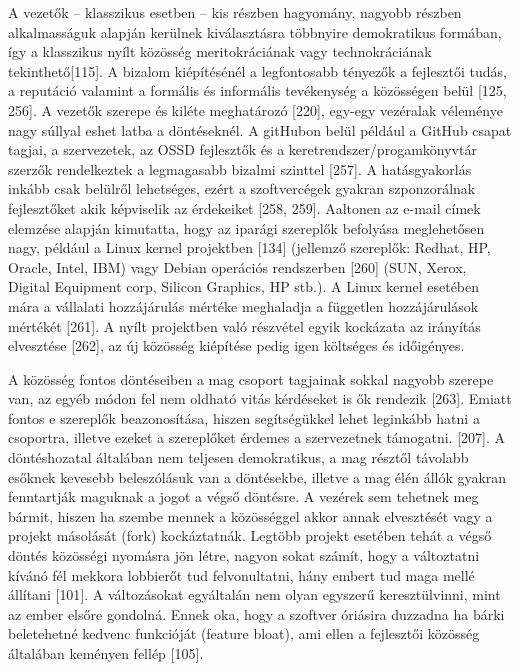 \documentclass[12pt,magyar,a4paper,oneside]{scrreprt}
\begin{document}
A vezetők -- klasszikus esetben -- kis részben hagyomány, nagyobb
részben alkalmasságuk alapján kerülnek kiválasztásra többnyire
demokratikus formában, így a klasszikus nyílt közösség meritokráciának
vagy technokráciának tekinthető{[}115{]}. A bizalom kiépítésénél a
legfontosabb tényezők a fejlesztői tudás, a reputáció valamint a
formális és informális tevékenység a közösségen belül {[}125, 256{]}. A
vezetők szerepe és kiléte meghatározó {[}220{]}, egy-egy vezéralak
véleménye nagy súllyal eshet latba a döntéseknél. A gitHubon belül
például a GitHub csapat tagjai, a szervezetek, az OSSD fejlesztők és a
keretrendszer/progamkönyvtár szerzők rendelkeztek a legmagasabb bizalmi
szinttel {[}257{]}. A hatásgyakorlás inkább csak belülről lehetséges,
ezért a szoftvercégek gyakran szponzorálnak fejlesztőket akik képviselik
az érdekeiket {[}258, 259{]}. Aaltonen az e-mail címek elemzése alapján
kimutatta, hogy az iparági szereplők befolyása meglehetősen nagy,
például a Linux kernel projektben {[}134{]} (jellemző szereplők: Redhat,
HP, Oracle, Intel, IBM) vagy Debian operációs rendszerben {[}260{]}
(SUN, Xerox, Digital Equipment corp, Silicon Graphics, HP stb.). A Linux
kernel esetében mára a vállalati hozzájárulás mértéke meghaladja a
független hozzájárulások mértékét {[}261{]}. A nyílt projektben való
részvétel egyik kockázata az irányítás elvesztése {[}262{]}, az új
közösség kiépítése pedig igen költséges és időigényes.

A közösség fontos döntéseiben a mag csoport tagjainak sokkal nagyobb
szerepe van, az egyéb módon fel nem oldható vitás kérdéseket is ők
rendezik {[}263{]}. Emiatt fontos e szereplők beazonosítása, hiszen
segítségükkel lehet leginkább hatni a csoportra, illetve ezeket a
szereplőket érdemes a szervezetnek támogatni. {[}207{]}. A döntéshozatal
általában nem teljesen demokratikus, a mag résztől távolabb esőknek
kevesebb beleszólásuk van a döntésekbe, illetve a mag élén állók gyakran
fenntartják maguknak a jogot a végső döntésre. A vezérek sem tehetnek
meg bármit, hiszen ha szembe mennek a közösséggel akkor annak
elvesztését vagy a projekt másolását (fork) kockáztatnák. Legtöbb
projekt esetében tehát a végső döntés közösségi nyomásra jön létre,
nagyon sokat számít, hogy a változtatni kívánó fél mekkora lobbierőt tud
felvonultatni, hány embert tud maga mellé állítani {[}101{]}. A
változásokat egyáltalán nem olyan egyszerű keresztülvinni, mint az ember
elsőre gondolná. Ennek oka, hogy a szoftver óriásira duzzadna ha bárki
beletehetné kedvenc funkcióját (feature bloat), ami ellen a fejlesztői
közösség általában keményen fellép {[}105{]}.
\end{document}
